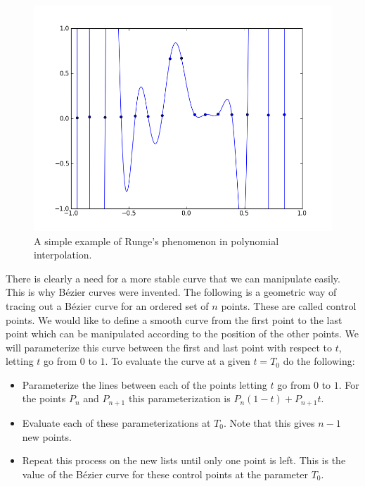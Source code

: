 \begin{figure}
\includegraphics[width=.9\textwidth]{bad_interpolation2}
\caption{A simple example of Runge's phenomenon in polynomial interpolation.}
\label{bezier:bad_interpolation2}
\end{figure}

There is clearly a need for a more stable curve that we can manipulate easily. 
This is why B\'{e}zier curves were invented. 
The following is a geometric way of tracing out a B\'{e}zier curve for an ordered set of $n$ points. 
These are called control points. 
We would like to define a smooth curve from the first point to the last point which can be manipulated according to the position of the other points. 
We will parameterize this curve between the first and last point with respect to $t$, letting $t$ go from $0$ to $1$. 
To evaluate the curve at a given $t=T_0$ do the following:
\begin{itemize}

\item

Parameterize the lines between each of the points letting $t$ go from $0$ to $1$. 
For the points $P_{n}$ and $P_{n+1}$ this parameterization is $P_{n} (1-t) + P_{n+1} t$.

\item

Evaluate each of these parameterizations at $T_0$. 
Note that this gives $n-1$ new points.

\item

Repeat this process on the new lists until only one point is left. 
This is the value of the B\'{e}zier curve for these control points at the parameter $T_0$.

\end{itemize}

